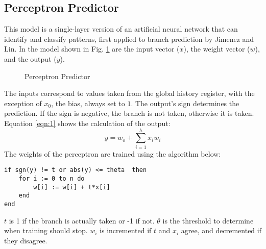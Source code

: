 \documentclass[conference]{IEEEtran}
\begin{document}
\subsection{Perceptron Predictor} \label{ssec:perceptron}
This model is a single-layer version of an artificial neural network that can identify and classify patterns, first applied to branch prediction by Jimenez and Lin\cite{jimenez2001dynamic}. In the model shown in Fig. \ref{fig:perceptron} are the input vector ($x$), the weight vector ($w$), and the output ($y$).
\begin{figure}
    \centering
    \caption{Perceptron Predictor}
	\label{fig:perceptron}
\end{figure}
The inputs correspond to values taken from the global history register, with the exception of $x_0$, the bias, always set to $1$. The output's sign determines the prediction. If the sign is negative, the branch is not taken, otherwise it is taken. Equation \eqref{eqn:1} shows the calculation of the output:
\begin{equation}
    y = w_o + \sum_{i=1}^{h}{x_iw_i}
    \label{eqn:1}
\end{equation}
\pagebreak
The weights of the perceptron are trained using the algorithm below:
\begin{lstlisting}
if sgn(y) != t or abs(y) <= theta  then
    for i := 0 to n do
        w[i] := w[i] + t*x[i]
    end
end
\end{lstlisting}
$t$ is 1 if the branch is actually taken or -1 if not. $\theta$ is the threshold to determine when training should stop. $w_i$ is incremented if $t$ and $x_i$ agree, and decremented if they disagree.
\end{document}
